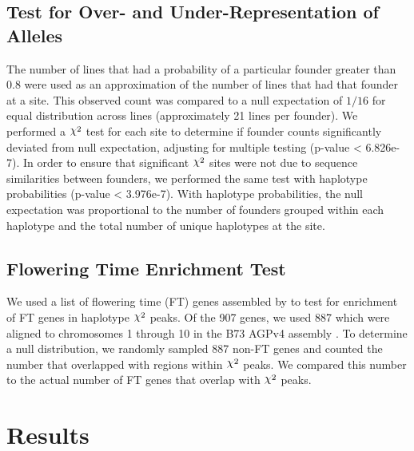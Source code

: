 \documentclass[article,9pt,twocolumn,twoside]{rilabRxiv}
\DeclareRobustCommand{\rchi}{{\mathpalette\irchi\relax}}
\newcommand{\irchi}[2]{\raisebox{\depth}{$#1\chi$}} %
\begin{document}
\subsection{Test for Over- and Under-Representation of Alleles}
The number of lines that had a probability of a particular founder greater than 0.8 were used as  an approximation of the number of lines that had that founder at a site.
This observed count was compared to a null expectation of $1/16$ for equal distribution across lines (approximately 21 lines per founder).
We performed a $\rchi^2$ test for each site to determine if founder counts significantly deviated from null expectation, adjusting for multiple testing (p-value < 6.826e-7).
In order to ensure that significant $\rchi^2$ sites were not due to sequence similarities between founders, we performed the same test with haplotype probabilities (p-value < 3.976e-7).
With haplotype probabilities, the null expectation was proportional to the number of founders grouped within each haplotype and the total number of unique haplotypes at the site.

\subsection{Flowering Time Enrichment Test}
We used a list of flowering time (FT) genes assembled by \citep{Li5} to test for enrichment of FT genes in haplotype $\rchi^2$ peaks.
Of the 907 genes, we used 887 which were aligned to chromosomes 1 through 10 in the B73 AGPv4 assembly \citep{Jiao}.
To determine a null distribution, we randomly sampled 887 non-FT genes and counted the number that overlapped with regions within $\rchi^2$ peaks.
We compared this number to the actual number of FT genes that overlap with $\rchi^2$ peaks.


\section{Results}
\end{document}
